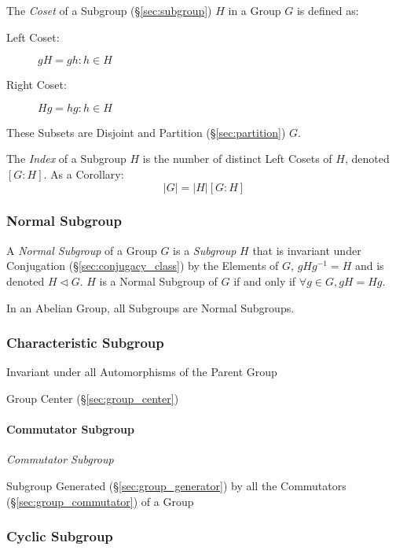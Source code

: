 The \emph{Coset} of a Subgroup (\S\ref{sec:subgroup}) $H$ in a Group
$G$ is defined as:
\begin{description}
\item[Left Coset:] $gH = {gh : h \in H}$
\item[Right Coset:] $Hg = {hg : h \in H}$
\end{description}
These Subsets are Disjoint and Partition (\S\ref{sec:partition}) $G$.

The \emph{Index} of a Subgroup $H$ is the number of distinct Left
Cosets of $H$, denoted $[G:H]$. As a Corollary:
\[
    |G| = |H|[G:H]
\]



\subsubsection{Normal Subgroup}\label{sec:normal_subgroup}

A \emph{Normal Subgroup} of a Group $G$ is a \emph{Subgroup} $H$ that
is invariant under Conjugation (\S\ref{sec:conjugacy_class}) by the
Elements of $G$, $gHg^{-1} = H$ and is denoted $H \triangleleft G$.
$H$ is a Normal Subgroup of $G$ if and only if $\forall g \in G, gH =
Hg$.

In an Abelian Group, all Subgroups are Normal Subgroups.



\subsubsection{Characteristic Subgroup}\label{sec:characteristic_subgroup}

Invariant under all Automorphisms of the Parent Group

Group Center (\S\ref{sec:group_center})



\paragraph{Commutator Subgroup}\label{sec:commutator_subgroup}\hfill

\emph{Commutator Subgroup}

Subgroup Generated (\S\ref{sec:group_generator}) by all the
Commutators (\S\ref{sec:group_commutator}) of a Group



\subsubsection{Cyclic Subgroup}\label{sec:cyclic_subgroup}

